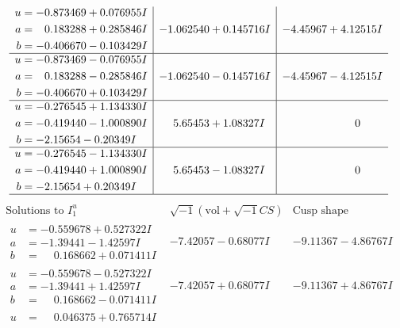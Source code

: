 \documentclass[1p]{elsarticle_modified}
\theoremstyle{definition}
\newcommand{\I}{\sqrt{-1}}
\begin{document}
$$\begin{array}{c|c|c}
\begin{aligned}
u &= -0.873469 + 0.076955 I \\
a &= \phantom{-}0.183288 + 0.285846 I \\
b &= -0.406670 - 0.103429 I\end{aligned}
 & -1.062540 + 0.145716 I & -4.45967 + 4.12515 I \\ \hline\begin{aligned}
u &= -0.873469 - 0.076955 I \\
a &= \phantom{-}0.183288 - 0.285846 I \\
b &= -0.406670 + 0.103429 I\end{aligned}
 & -1.062540 - 0.145716 I & -4.45967 - 4.12515 I \\ \hline\begin{aligned}
u &= -0.276545 + 1.134330 I \\
a &= -0.419440 - 1.000890 I \\
b &= -2.15654 - 0.20349 I\end{aligned}
 & \phantom{-}5.65453 + 1.08327 I & \phantom{-0.000000 } 0 \\ \hline\begin{aligned}
u &= -0.276545 - 1.134330 I \\
a &= -0.419440 + 1.000890 I \\
b &= -2.15654 + 0.20349 I\end{aligned}
 & \phantom{-}5.65453 - 1.08327 I & \phantom{-0.000000 } 0\\
 \hline 
 \end{array}$$\newpage$$\begin{array}{c|c|c}  
\text{Solutions to }I^u_{1}& \I (\text{vol} + \sqrt{-1}CS) & \text{Cusp shape}\\
 \hline 
\begin{aligned}
u &= -0.559678 + 0.527322 I \\
a &= -1.39441 - 1.42597 I \\
b &= \phantom{-}0.168662 + 0.071411 I\end{aligned}
 & -7.42057 - 0.68077 I & -9.11367 - 4.86767 I \\ \hline\begin{aligned}
u &= -0.559678 - 0.527322 I \\
a &= -1.39441 + 1.42597 I \\
b &= \phantom{-}0.168662 - 0.071411 I\end{aligned}
 & -7.42057 + 0.68077 I & -9.11367 + 4.86767 I \\ \hline\begin{aligned}
u &= \phantom{-}0.046375 + 0.765714 I \\

\end{aligned}
\end{array}$$
\end{document}
